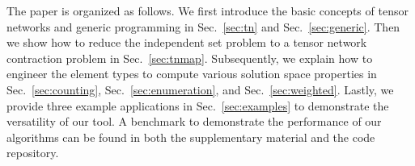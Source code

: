 \documentclass[onefignum, onetabnum]{siamart190516}
\newcommand{\<}{\langle}
\renewcommand{\>}{\rangle}
\newcommand{\Sec}[1]{Sec.~\ref{#1}}
\newcounter{example}
\begin{document}
The paper is organized as follows.
We first introduce the basic concepts of tensor networks and generic programming in \Sec{sec:tn} and \Sec{sec:generic}.
Then we show how to reduce the independent set problem to a tensor network contraction problem in \Sec{sec:tnmap}. 
Subsequently, we explain how to engineer the element types to compute various solution space properties in \Sec{sec:counting}, \Sec{sec:enumeration}, and \Sec{sec:weighted}. %
Lastly, we provide three example applications in \Sec{sec:examples} to demonstrate the versatility of our tool.
A benchmark to demonstrate the performance of our algorithms can be found in both the supplementary material and the code repository.
\end{document}
